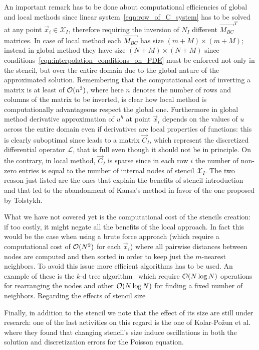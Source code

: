 \bigskip
An important remark has to be done about computational efficiencies of global and local methods since linear system~\eqref{eqn:row_of_C_system} has to be solved at any point $\vec{x}_i \in \mathcal{X}_I$, therefore requiring the inversion of $N_I$ different $\vec{M_{BC}}^T$ matrices. In case of local method each $\vec{M_{BC}}$ has size $(m+M) \times (m+M)$; instead in global method they have size $(N+M) \times (N+M)$ since conditions~\eqref{eqn:interpolation_conditions_on_PDE} must be enforced not only in the stencil, but over the entire domain due to the global nature of the approximated solution. Remembering that the computational cost of inverting a matrix is at least of $\mathcal{O}(n^3)$, where here $n$ denotes the number of rows and columns of the matrix to be inverted, is clear how local method is computationally advantageous respect the global one.
Furthermore in global method derivative approximation of $u^h$ at point $\vec{x}_i$ depends on the values of $u$ across the entire domain even if derivatives are local properties of functions: this is clearly suboptimal since leads to a matrix $\vec{C}_I$, which represent the discretized differential operator $\mathcal{L}$, that is full even though it should not be in principle. On the contrary, in local method, $\vec{C}_I$ is sparse since in each row $i$ the number of non-zero entries is equal to the number of internal nodes of stencil $\mathcal{X}_I$.
The two reason just listed are the ones that explain the benefits of stencil introduction and that led to the abandonment of Kansa's method in favor of the one proposed by Tolstykh.

What we have not covered yet is the computational cost of the stencils creation: if too costly, it might negate all the benefits of the local approach. In fact this would be the case when using a brute force approach (which require a computational cost of $\mathcal{O}(N^2)$ for each $\vec{x}_i$) where all pairwise distances between nodes are computed and then sorted in order to keep just the $m$-nearest neighbors. To avoid this issue more efficient algorithms has to be used. An example of these is the $k$-d tree algorithm~\cite{Bentley:k-d_tree} which require $\mathcal{O}(N \log N)$ operations for rearranging the nodes and other $\mathcal{O}(N \log N)$ for finding a fixed number of neighbors. Regarding the effects of stencil size 

\bigskip
Finally, in addition to the stencil we note that the effect of its size are still under research: one of the last activities on this regard is the one of Kolar-Požun et al.~\cite{Kolar-Požun:effect_of_stencil_size} where they found that changing stencil's size induce oscillations in both the solution and discretization errors for the Poisson equation.

